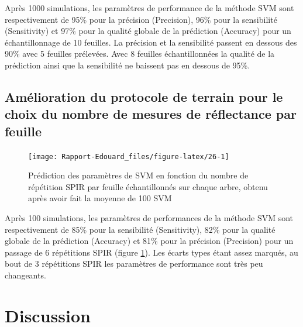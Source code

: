 \documentclass[
  11pt,
  french,
  a4paper,
  extrafontsizes,onecolumn,openright
  ]{memoir}
\begin{document}
Après 1000 simulations, les paramètres de performance de la méthode SVM sont respectivement de 95\% pour la précision (Precision), 96\% pour la sensibilité (Sensitivity) et 97\% pour la qualité globale de la prédiction (Accuracy) pour un échantillonnage de 10 feuilles. La précision et la sensibilité passent en dessous des 90\% avec 5 feuilles prélevées. Avec 8 feuilles échantillonnées la qualité de la prédiction ainsi que la sensibilité ne baissent pas en dessous de 95\%.

\vfill
\newpage

\hypertarget{amuxe9lioration-du-protocole-de-terrain-pour-le-choix-du-nombre-de-mesures-de-ruxe9flectance-par-feuille}{%
\section{Amélioration du protocole de terrain pour le choix du nombre de mesures de réflectance par feuille}\label{amuxe9lioration-du-protocole-de-terrain-pour-le-choix-du-nombre-de-mesures-de-ruxe9flectance-par-feuille}}

\scriptsize

\begin{figure}

{\centering \texttt{[image: Rapport-Edouard\_files/figure-latex/26-1]} 

}

\caption{Prédiction des paramètres de SVM en fonction du nombre de répétition SPIR par feuille échantillonnés sur chaque arbre, obtenu après avoir fait la moyenne de 100 SVM}\label{fig:26}
\end{figure}

\normalsize

Après 100 simulations, les paramètres de performances de la méthode SVM sont respectivement de 85\% pour la sensibilité (Sensitivity), 82\% pour la qualité globale de la prédiction (Accuracy) et 81\% pour la précision (Precision) pour un passage de 6 répétitions SPIR (figure \ref{fig:26}). Les écarts types étant assez marqués, au bout de 3 répétitions SPIR les paramètres de performance sont très peu changeants.

\vfill
\newpage

\hypertarget{discussion}{%
\chapter{Discussion}\label{discussion}}
\end{document}
